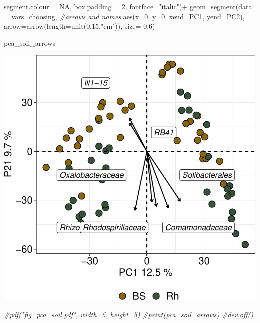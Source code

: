 \documentclass[]{interact}
\theoremstyle{plain}%
\theoremstyle{definition}
\theoremstyle{remark}
\newenvironment{Shaded}{\begin{snugshade}}{\end{snugshade}}
\newcommand{\AttributeTok}[1]{\textcolor[rgb]{0.77,0.63,0.00}{#1}}
\newcommand{\CommentTok}[1]{\textcolor[rgb]{0.56,0.35,0.01}{\textit{#1}}}
\newcommand{\ConstantTok}[1]{\textcolor[rgb]{0.00,0.00,0.00}{#1}}
\newcommand{\DecValTok}[1]{\textcolor[rgb]{0.00,0.00,0.81}{#1}}
\newcommand{\FloatTok}[1]{\textcolor[rgb]{0.00,0.00,0.81}{#1}}
\newcommand{\FunctionTok}[1]{\textcolor[rgb]{0.00,0.00,0.00}{#1}}
\newcommand{\NormalTok}[1]{#1}
\newcommand{\SpecialCharTok}[1]{\textcolor[rgb]{0.00,0.00,0.00}{#1}}
\newcommand{\StringTok}[1]{\textcolor[rgb]{0.31,0.60,0.02}{#1}}
\begin{document}
\begin{Shaded}
\begin{Highlighting}[]
                            \AttributeTok{segment.colour =} \ConstantTok{NA}\NormalTok{, }\AttributeTok{box.padding =} \DecValTok{2}\NormalTok{, }\AttributeTok{fontface=}\StringTok{"italic"}\NormalTok{)}\SpecialCharTok{+}
  \FunctionTok{geom\_segment}\NormalTok{(}\AttributeTok{data =}\NormalTok{ vars\_choosing,  }\CommentTok{\#arrows and names}
               \FunctionTok{aes}\NormalTok{(}\AttributeTok{x=}\DecValTok{0}\NormalTok{, }\AttributeTok{y=}\DecValTok{0}\NormalTok{, }\AttributeTok{xend=}\NormalTok{PC1, }\AttributeTok{yend=}\NormalTok{PC2), }
               \AttributeTok{arrow=}\FunctionTok{arrow}\NormalTok{(}\AttributeTok{length=}\FunctionTok{unit}\NormalTok{(}\FloatTok{0.15}\NormalTok{,}\StringTok{"cm"}\NormalTok{)),}
               \AttributeTok{size=} \FloatTok{0.6}\NormalTok{)}

\NormalTok{pca\_soil\_arrows}
\end{Highlighting}
\end{Shaded}

\begin{center}\includegraphics{Doc_pdf_files/figure-latex/unnamed-chunk-24-1} \end{center}

\begin{Shaded}
\begin{Highlighting}[]
\CommentTok{\#pdf("fig\_pca\_soil.pdf", width=5, height=5)}
\CommentTok{\#print(pca\_soil\_arrows)}
\CommentTok{\#dev.off()}
\end{Highlighting}
\end{Shaded}
\end{document}
